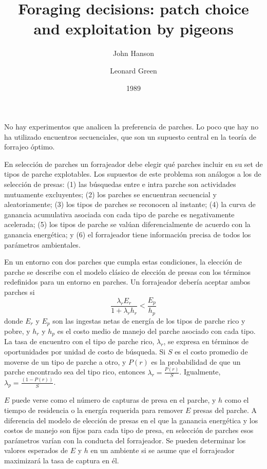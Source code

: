 \documentclass[a4paper,12pt]{article}
\title{Foraging decisions: patch choice and exploitation by pigeons}
\author{John Hanson \and Leonard Green}
\date{1989}
\begin{document}
{\scshape\bfseries \maketitle}

No hay experimentos que analicen la preferencia de parches. Lo poco que hay no ha utilizado encuentros secuenciales, que son un supuesto central en la teoría de forrajeo óptimo.

En selección de parches un forrajeador debe elegir qué parches incluir en su set de tipos de parche explotables. Los supuestos de este problema son análogos a los de selección de presas: (1) las búsquedas entre e intra parche son actividades mutuamente excluyentes; (2) los parches se encuentran secuencial y aleatoriamente; (3) los tipos de parches se reconocen al instante; (4) la curva de ganancia acumulativa asociada con cada tipo de parche es negativamente acelerada; (5) los tipos de parche se valúan diferencialmente de acuerdo con la ganancia energética; y (6) el forrajeador tiene información precisa de todos los parámetros ambientales.

En un entorno con dos parches que cumpla estas condiciones, la elección de parche se describe con el modelo clásico de elección de presas con los términos redefinidos para un entorno en parches. Un forrajeador debería aceptar ambos parches si 
\begin{equation}
	\frac{
		\lambda_{r}E_{r}
	}{
		1 + \lambda_{r}h_{r}
	}
	<
	\frac{
		E_{p}
	}{
		h_{p}
	}
\end{equation}
donde $E_{r}$ y $E_{p}$ son las ingestas netas de energía de los tipos de parche rico y pobre, y $h_{r}$ y $h_{p}$ es el costo medio de manejo del parche asociado con cada tipo. La tasa de encuentro con el tipo de parche rico, $\lambda_{r}$, se expresa en términos de oportunidades por unidad de costo de búsqueda. Si $S$ es el costo promedio de moverse de un tipo de parche a otro, y $P(r)$ es la probabilidad de que un parche encontrado sea del tipo rico, entonces $\lambda_{r} = \frac{P(r)}{S}$. Igualmente, $\lambda_{p} = \frac{(1-P(r))}{S}$.

$E$ puede verse como el número de capturas de presa en el parche, y $h$ como el tiempo de residencia o la energía requerida para remover $E$ presas del parche. A diferencia del modelo de elección de presas en el que la ganancia energética y los costos de manejo son fijos para cada tipo de presa, en selección de parches esos parámetros varían con la conducta del forrajeador. Se pueden determinar los valores esperados de $E$ y $h$ en un ambiente si se asume que el forrajeador maximizará la tasa de captura en él.
\end{document}
